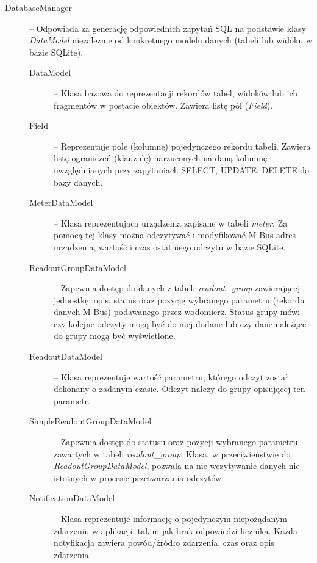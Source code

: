 \begin{description}
	\item[DatabaseManager] -- Odpowiada za generację odpowiednich zapytań SQL na podstawie klasy \textit{DataModel} niezależnie od konkretnego modelu danych (tabeli lub widoku w bazie SQLite).

		\begin{description}
					\item[DataModel] -- Klasa bazowa do reprezentacji rekordów tabel, widoków lub ich fragmentów w postacie obiektów.
					Zawiera listę pól (\textit{Field}).

					\item[Field] -- Reprezentuje pole (kolumnę) pojedynczego rekordu tabeli.
					Zawiera listę ograniczeń (klauzulę) narzuconych na daną kolumnę uwzględnianych przy zapytaniach SELECT, UPDATE, DELETE do bazy danych.

					\item[MeterDataModel] -- Klasa reprezentująca urządzenia zapisane w tabeli \textit{meter}.
					Za pomocą tej klasy można odczytywać i modyfikować M-Bus adres urządzenia, wartość i czas ostatniego odczytu w bazie SQLite.

					\item[ReadoutGroupDataModel] -- Zapewnia dostęp do danych z tabeli \textit{readout{\_}group} zawierającej jednostkę, opis, status oraz pozycję wybranego parametru (rekordu danych M-Bus) podawanego przez wodomierz.
					Status grupy mówi czy kolejne odczyty mogą być do niej dodane lub czy dane należące do grupy mogą być wyświetlone.

					\item[ReadoutDataModel] -- Klasa reprezentuje wartość parametru, którego odczyt został dokonany o zadanym czasie.
					Odczyt należy do grupy opisującej ten parametr.

					\item[SimpleReadoutGroupDataModel] -- Zapewnia dostęp do statusu oraz pozycji wybranego parametru zawartych w tabeli \textit{readout{\_}group}.
					Klasa, w przeciwieństwie do \textit{ReadoutGroupDataModel}, pozwala na nie wczytywanie danych nie istotnych w procesie przetwarzania odczytów.

					\item[NotificationDataModel] -- Klasa reprezentuje informację o pojedynczym niepożądanym zdarzeniu w aplikacji, takim jak brak odpowiedzi licznika.
					Każda notyfikacja zawiera powód/źródło zdarzenia, czas oraz opis zdarzenia.
		\end{description}	

\end{description}


